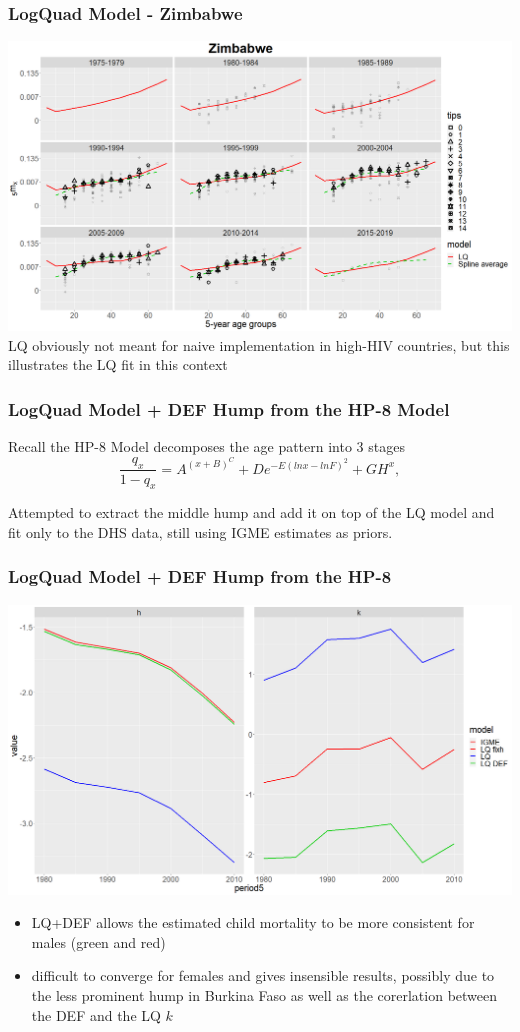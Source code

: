 \documentclass[hyperref={colorlinks, citecolor=blue}]{beamer}
\begin{document}
\begin{frame}
\frametitle{LogQuad Model - Zimbabwe}
\includegraphics[width=\linewidth]{Graphs/Zimbabwe LQ female.png}
LQ obviously not meant for naive implementation in high-HIV countries, but this illustrates the LQ fit in this context
\end{frame}

\begin{frame}
\frametitle{LogQuad Model + DEF Hump from the HP-8 Model}
Recall the HP-8 Model decomposes the age pattern into 3 stages
\begin{equation*}
	\frac{q_x}{1-q_x} = A^{(x + B)^C} + D e^{-E(ln x - ln F)^2} + GH^x,
\end{equation*}

Attempted to extract the middle hump and add it on top of the LQ model and fit only to the DHS data, still using IGME estimates as priors.
\end{frame}

\begin{frame}
\frametitle{LogQuad Model + DEF Hump from the HP-8}
\includegraphics[scale=0.18]{Graphs/fix DEF hk males.png}

\begin{itemize}
\item LQ+DEF allows the estimated child mortality to be more consistent for males (green and red)
\item difficult to converge for females and gives insensible results, possibly due to the less prominent hump in Burkina Faso as well as the corerlation between the DEF and the LQ $k$
\end{itemize}
\end{frame}
\end{document}

